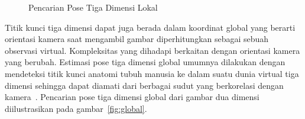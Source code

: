 \begin{figure}[htbp]
    \begin{center}
    \end{center}
    \vspace{-20pt}
    \captionsetup{labelfont=bf, textfont=bf}
    \caption{Pencarian Pose Tiga Dimensi Lokal}
    \vspace{-10pt}
    \captionsetup{labelfont=md, textfont=md}
    \label{fig:lokal}
\end{figure}

Titik kunci tiga dimensi dapat juga berada dalam koordinat global yang berarti orientasi kamera
saat mengambil gambar diperhitungkan sebagai sebuah observasi virtual. Kompleksitas yang dihadapi
berkaitan dengan orientasi kamera yang berubah. Estimasi pose tiga dimensi global umumnya dilakukan
dengan mendeteksi titik kunci anatomi tubuh manusia ke dalam suatu dunia virtual tiga dimensi sehingga
dapat diamati dari berbagai sudut yang berkorelasi dengan kamera~\cite{2017arXiv170402447Z, 2019arXiv190700837M}.
Pencarian pose tiga dimensi global dari gambar dua dimensi diilustrasikan pada gambar~\ref{fig:global}.

